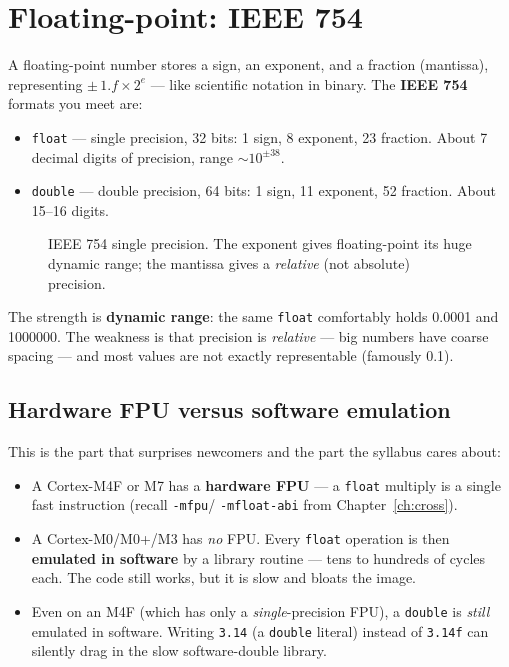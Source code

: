 \documentclass[11pt,a4paper,oneside]{book}
\newcommand{\code}[1]{\texttt{#1}}
\begin{document}
\section{Floating-point: IEEE 754}
A floating-point number stores a sign, an exponent, and a fraction (mantissa),
representing $\pm\,1.f \times 2^{e}$ --- like scientific notation in binary. The
\textbf{IEEE 754} formats you meet are:
\begin{itemize}[leftmargin=1.4cm]
  \item \code{float} --- single precision, 32 bits: 1 sign, 8 exponent, 23
        fraction. About 7 decimal digits of precision, range $\sim10^{\pm38}$.
  \item \code{double} --- double precision, 64 bits: 1 sign, 11 exponent, 52
        fraction. About 15--16 digits.
\end{itemize}
\begin{figure}[h]
\centering
{}
\caption{IEEE 754 single precision. The exponent gives floating-point its huge
dynamic range; the mantissa gives a \emph{relative} (not absolute) precision.}
\label{fig:ieee754}
\end{figure}

The strength is \textbf{dynamic range}: the same \code{float} comfortably holds
\num{0.0001} and \num{1000000}. The weakness is that precision is
\emph{relative} --- big numbers have coarse spacing --- and most values are not
exactly representable (famously \num{0.1}).

\subsection{Hardware FPU versus software emulation}
This is the part that surprises newcomers and the part the syllabus cares about:
\begin{itemize}[leftmargin=1.4cm]
  \item A Cortex-M4F or M7 has a \textbf{hardware FPU} --- a \code{float}
        multiply is a single fast instruction (recall \code{-mfpu}/
        \code{-mfloat-abi} from Chapter~\ref{ch:cross}).
  \item A Cortex-M0/M0+/M3 has \emph{no} FPU. Every \code{float} operation is
        then \textbf{emulated in software} by a library routine --- tens to
        hundreds of cycles each. The code still works, but it is slow and bloats
        the image.
  \item Even on an M4F (which has only a \emph{single}-precision FPU), a
        \code{double} is \emph{still} emulated in software. Writing \code{3.14}
        (a \code{double} literal) instead of \code{3.14f} can silently drag in
        the slow software-double library.
\end{itemize}
\end{document}
